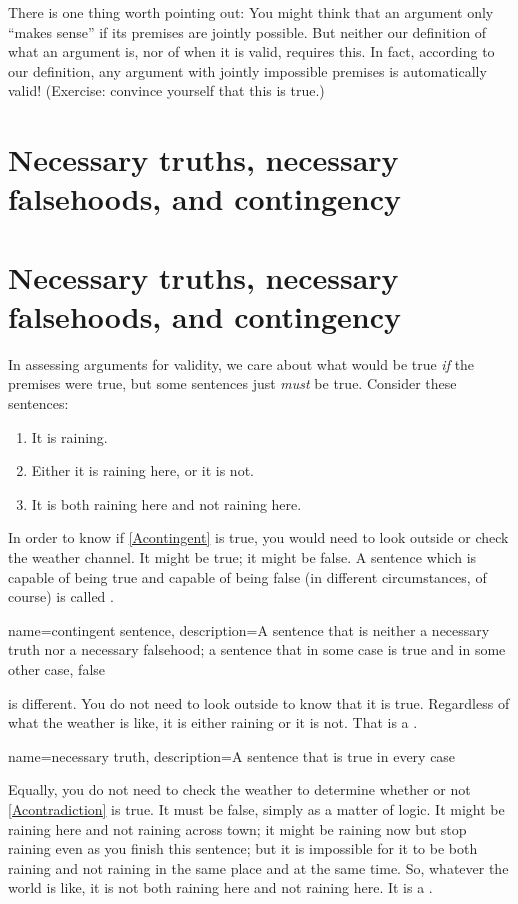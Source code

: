 There is one thing worth pointing out: You might think that an
argument only ``makes sense'' if its premises are jointly possible.
But neither our definition of what an argument is, nor of when it is
valid, requires this. In fact, according to our definition, any
argument with jointly impossible premises is automatically valid!
(Exercise: convince yourself that this is true.)

\ifHTMLtarget
\section{Necessary truths, necessary falsehoods, and contingency}
\else
\section[Necessary truths and falsehoods]{Necessary truths, necessary falsehoods, and contingency}
\fi

In assessing arguments for validity, we care about what would be true \emph{if} the premises were true, but some sentences just \emph{must} be true. Consider these sentences:
	\begin{enumerate}
		\item\label{Acontingent} It is raining.
		\item\label{Atautology} Either it is raining here, or it is not.
		\item\label{Acontradiction} It is both raining here and not raining here.
	\end{enumerate}
In order to know if \cref*{Acontingent} is true, you would need to look outside or check the weather channel. It might be true; it might be false. A sentence which is capable of being true and capable of being false (in different circumstances, of course) is called .

{
name=contingent sentence,
description={A sentence that is neither a \gls{necessary truth} nor a \gls{necessary falsehood}; a sentence that in some case is true and in some other case, false}
}

 is different. You do not need to look outside to know that it is true. Regardless of what the weather is like, it is either raining or it is not. That is a .

{
name={necessary truth},
description={A sentence that is true in every case}
}

Equally, you do not need to check the weather to determine whether or not \cref*{Acontradiction} is true. It must be false, simply as a matter of logic. It might be raining here and not raining across town; it might be raining now but stop raining even as you finish this sentence; but it is impossible for it to be both raining and not raining in the same place and at the same time. So, whatever the world is like, it is not both raining here and not raining here. It is a .

